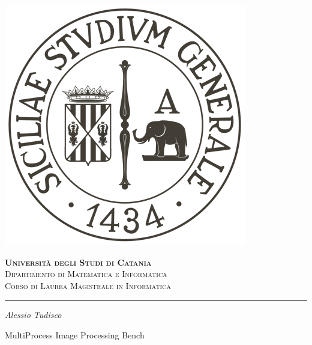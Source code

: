 \begin{titlepage}
	
\centering

\includegraphics[scale=0.25]{components/images/university-logo}

\bigskip

\gdef\@phd@university{
	{\LARGE \bfseries Universit\`{a} degli Studi di Catania}\\ 
	{\large Dipartimento di Matematica e Informatica}\\ 
	{Corso di Laurea Magistrale in Informatica}\\
	\bigskip}

\textsc{\@phd@university}\par

\hrule

\bigskip

\bigskip

\bigskip

\bigskip

\bigskip

\bigskip

{\itshape \large
	Alessio Tudisco\par
}

\bigskip

\bigskip

\bigskip

\bigskip

\bigskip

\bigskip

{\Large MultiProcess Image Processing Bench}\par


\end{titlepage}
